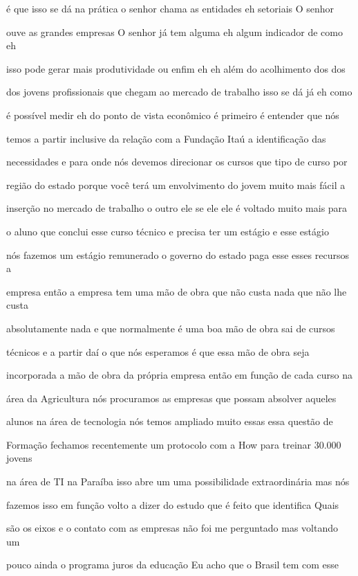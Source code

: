 \documentclass[a4paper,12pt]{article}
\begin{document}
é que isso se dá na prática o senhor chama as entidades eh setoriais O senhor

ouve as grandes empresas O senhor já tem alguma eh algum indicador de como eh

isso pode gerar mais produtividade ou enfim eh eh além do acolhimento dos dos

dos jovens profissionais que chegam ao mercado de trabalho isso se dá já eh como

é possível medir eh do ponto de vista econômico é primeiro é entender que nós

temos a partir inclusive da relação com a Fundação Itaú a identificação das

necessidades e para onde nós devemos direcionar os cursos que tipo de curso por

região do estado porque você terá um envolvimento do jovem muito mais fácil a

inserção no mercado de trabalho o outro ele se ele ele é voltado muito mais para

o aluno que conclui esse curso técnico e precisa ter um estágio e esse estágio

nós fazemos um estágio remunerado o governo do estado paga esse esses recursos a

empresa então a empresa tem uma mão de obra que não custa nada que não lhe custa

absolutamente nada e que normalmente é uma boa mão de obra sai de cursos

técnicos e a partir daí o que nós esperamos é que essa mão de obra seja

incorporada a mão de obra da própria empresa então em função de cada curso na

área da Agricultura nós procuramos as empresas que possam absolver aqueles

alunos na área de tecnologia nós temos ampliado muito essas essa questão de

Formação fechamos recentemente um protocolo com a How para treinar 30.000 jovens

na área de TI na Paraíba isso abre um uma possibilidade extraordinária mas nós

fazemos isso em função volto a dizer do estudo que é feito que identifica Quais

são os eixos e o contato com as empresas não foi me perguntado mas voltando um

pouco ainda o programa juros da educação Eu acho que o Brasil tem com esse
\end{document}
